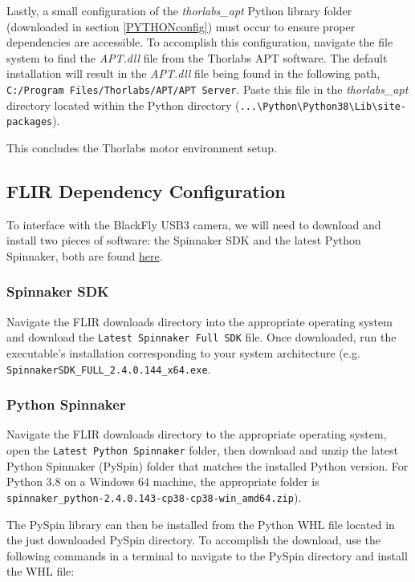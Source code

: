\documentclass[a4paper, 12pt]{report}
\begin{document}
    Lastly, a small configuration of the \textit{thorlabs\_apt} Python library folder (downloaded in section \ref{PYTHONconfig}) must occur to ensure proper dependencies are accessible. To accomplish this configuration, navigate the file system to find the \textit{APT.dll} file from the Thorlabs APT software. The default installation will result in the \textit{APT.dll} file being found in the following path, \verb|C:/Program Files/Thorlabs/APT/APT Server|. Paste this file in the \textit{thorlabs\_apt} directory located within the Python directory (\verb|...\Python\Python38\Lib\site-packages|).
    
    This concludes the Thorlabs motor environment setup.


    \subsection{FLIR Dependency Configuration}\label{FLIRconfig}
    To interface with the BlackFly USB3 camera, we will need to download and install two pieces of software: the Spinnaker SDK and the latest Python Spinnaker, both are found \href{https://flir.app.boxcn.net/v/SpinnakerSDK}{here}. 
    
    
    \subsubsection{Spinnaker SDK}
    Navigate the FLIR downloads directory into the appropriate operating system and download the \verb|Latest Spinnaker Full SDK| file. Once downloaded, run the executable's installation corresponding to your system architecture (e.g. \verb|SpinnakerSDK_FULL_2.4.0.144_x64.exe|.
    
    
    \subsubsection{Python Spinnaker}
    Navigate the FLIR downloads directory to the appropriate operating system, open the \verb|Latest Python Spinnaker| folder, then download and unzip the latest Python Spinnaker (PySpin) folder that matches the installed Python version. For Python 3.8 on a Windows 64 machine, the appropriate folder is \verb|spinnaker_python-2.4.0.143-cp38-cp38-win_amd64.zip|).
    
    The PySpin library can then be installed from the Python WHL file located in the just downloaded PySpin directory. To accomplish the download, use the following commands in a terminal to navigate to the PySpin directory and install the WHL file:
    
\end{document}
